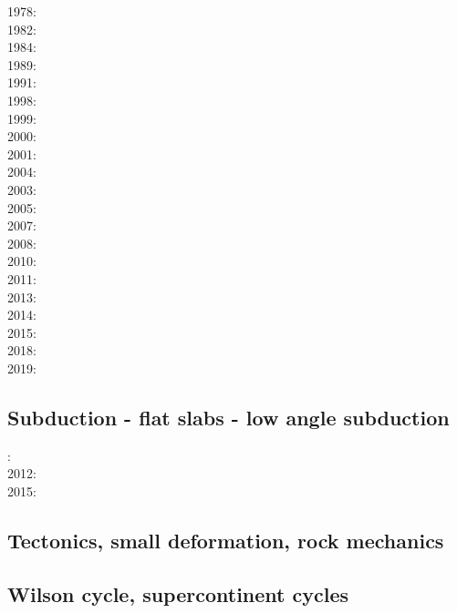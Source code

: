 1978: \cite{bird78}\\
1982: \cite{clwv82}\\
1984: \cite{cade84}\\
1989: \cite{clwv89}\\
1991: \cite{muph91}\\
1998: \cite{togu98}\\
1999: \cite{fagd99}\\
2000: \cite{pybf00}\\
2001: \cite{dohe01}\cite{reyb01}\cite{brry01}\\
2004: \cite{ster04}\cite{guhl04}\\
2003: \cite{hags03}\\
2005: \cite{bihi05}\\
2007: \cite{kore07}\\
2008: \cite{uegs08}\\
2010: \cite{nigm10}\cite{bucl10}\\
2011: \cite{bagw11}\cite{nigm11}\\
2013: \cite{dyge13}\cite{mana13}\cite{kore13}\\
2014: \cite{recf14}\cite{macg14}\\
2015: \cite{matv15}\cite{pebu15}\cite{vapm15}\\
2018: \cite{zhlg18}\cite{basq18}\\
2019: \cite{begb19}\cite{gubg19}

\subsection*{Subduction - flat slabs - low angle subduction}

: \cite{cube11}\\
2012: \cite{mapm12}\\
2015: \cite{gehm15}

\subsection*{Tectonics, small deformation, rock mechanics}

\cite{ilma93}
\cite{hept96}
\cite{esfm08}
\cite{lega12}

\subsection*{Wilson cycle, supercontinent cycles}


